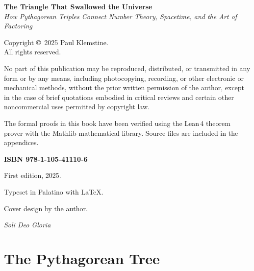 \documentclass[11pt,openright,twoside]{book}
\theoremstyle{definition}
\theoremstyle{remark}
\begin{document}
\thispagestyle{empty}
\vspace*{\fill}
\begin{small}
\noindent\textbf{The Triangle That Swallowed the Universe}\\
\textit{How Pythagorean Triples Connect Number Theory, Spacetime, and the Art of Factoring}

\bigskip
\noindent Copyright \copyright\ 2025 Paul Klemstine.\\
All rights reserved.

\bigskip
\noindent No part of this publication may be reproduced, distributed, or transmitted
in any form or by any means, including photocopying, recording, or other electronic
or mechanical methods, without the prior written permission of the author, except in
the case of brief quotations embodied in critical reviews and certain other
noncommercial uses permitted by copyright law.

\bigskip
\noindent The formal proofs in this book have been verified using the Lean\,4 theorem prover
with the Mathlib mathematical library. Source files are included in the appendices.

\bigskip
\noindent\textbf{ISBN 978-1-105-41110-6}

\bigskip
\noindent First edition, 2025.

\bigskip
\noindent Typeset in Palatino with \LaTeX.

\bigskip
\noindent Cover design by the author.

\end{small}
\vspace{1cm}
\newpage

\thispagestyle{empty}
\vspace*{4cm}
\begin{center}
{\Large\itshape Soli Deo Gloria}
\end{center}
\vfill
\newpage
\thispagestyle{empty}\mbox{}\newpage

\tableofcontents
\newpage

\mainmatter



\part{The Pythagorean Tree}
\label{part:tree}
\end{document}
